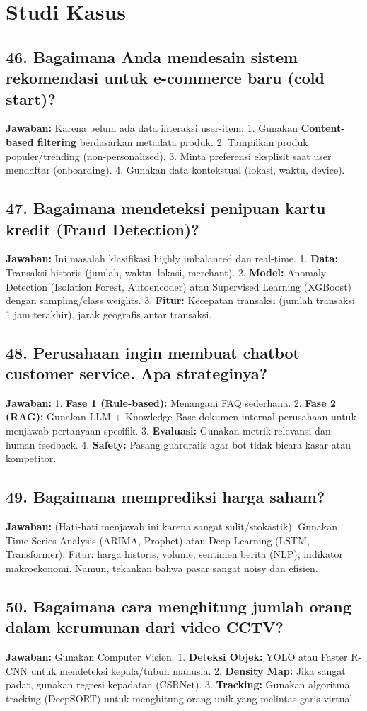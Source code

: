 \section{Studi Kasus}

\subsection{46. Bagaimana Anda mendesain sistem rekomendasi untuk e-commerce baru (cold start)?}
\textbf{Jawaban:}
Karena belum ada data interaksi user-item:
1. Gunakan \textbf{Content-based filtering} berdasarkan metadata produk.
2. Tampilkan produk populer/trending (non-personalized).
3. Minta preferensi eksplisit saat user mendaftar (onboarding).
4. Gunakan data kontekstual (lokasi, waktu, device).

\subsection{47. Bagaimana mendeteksi penipuan kartu kredit (Fraud Detection)?}
\textbf{Jawaban:}
Ini masalah klasifikasi highly imbalanced dan real-time.
1. \textbf{Data:} Transaksi historis (jumlah, waktu, lokasi, merchant).
2. \textbf{Model:} Anomaly Detection (Isolation Forest, Autoencoder) atau Supervised Learning (XGBoost) dengan sampling/class weights.
3. \textbf{Fitur:} Kecepatan transaksi (jumlah transaksi 1 jam terakhir), jarak geografis antar transaksi.

\subsection{48. Perusahaan ingin membuat chatbot customer service. Apa strateginya?}
\textbf{Jawaban:}
1. \textbf{Fase 1 (Rule-based):} Menangani FAQ sederhana.
2. \textbf{Fase 2 (RAG):} Gunakan LLM + Knowledge Base dokumen internal perusahaan untuk menjawab pertanyaan spesifik.
3. \textbf{Evaluasi:} Gunakan metrik relevansi dan human feedback.
4. \textbf{Safety:} Pasang guardrails agar bot tidak bicara kasar atau kompetitor.

\subsection{49. Bagaimana memprediksi harga saham?}
\textbf{Jawaban:}
(Hati-hati menjawab ini karena sangat sulit/stokastik).
Gunakan Time Series Analysis (ARIMA, Prophet) atau Deep Learning (LSTM, Transformer). Fitur: harga historis, volume, sentimen berita (NLP), indikator makroekonomi. Namun, tekankan bahwa pasar sangat noisy dan efisien.

\subsection{50. Bagaimana cara menghitung jumlah orang dalam kerumunan dari video CCTV?}
\textbf{Jawaban:}
Gunakan Computer Vision.
1. \textbf{Deteksi Objek:} YOLO atau Faster R-CNN untuk mendeteksi kepala/tubuh manusia.
2. \textbf{Density Map:} Jika sangat padat, gunakan regresi kepadatan (CSRNet).
3. \textbf{Tracking:} Gunakan algoritma tracking (DeepSORT) untuk menghitung orang unik yang melintas garis virtual.
